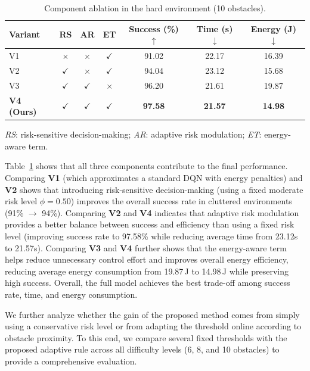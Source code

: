 \documentclass[runningheads]{llncs}
\begin{document}
\begin{table}[!htbp]
\centering
\caption{Component ablation in the hard environment (10 obstacles).}
\label{tab:ablation_components}
\setlength{\tabcolsep}{5pt}
\renewcommand{\arraystretch}{1.10}
\begin{tabular*}{\linewidth}{@{\extracolsep{\fill}}lcccccc@{}}
\hline
Variant & RS & AR & ET & Success (\%) $\uparrow$ & Time (s) $\downarrow$ & Energy (J) $\downarrow$ \\
\hline
V1 & $\times$     & $\times$     & $\checkmark$ & 91.02 & 22.17 & 16.39 \\
V2 & $\checkmark$ & $\times$     & $\checkmark$ & 94.04 & 23.12 & 15.68 \\
V3 & $\checkmark$ & $\checkmark$ & $\times$     & 96.20 & 21.61 & 19.87 \\
\textbf{V4 (Ours)} & $\checkmark$ & $\checkmark$ & $\checkmark$ & \textbf{97.58} & \textbf{21.57} & \textbf{14.98} \\
\hline
\end{tabular*}

\vspace{2pt}
\footnotesize
\textit{RS}: risk-sensitive decision-making; \textit{AR}: adaptive risk modulation; \textit{ET}: energy-aware term.
\end{table}

Table~\ref{tab:ablation_components} shows that all three components contribute to the final performance.
 Comparing \textbf{V1} (which approximates a standard DQN with energy penalties) and \textbf{V2} shows that introducing risk-sensitive decision-making (using a fixed moderate risk level $\phi=0.50$) improves the overall success rate in cluttered environments (91\% $\to$ 94\%).
Comparing \textbf{V2} and \textbf{V4} indicates that adaptive risk modulation provides a better balance between success and efficiency than using a fixed risk level (improving success rate to 97.58\% while reducing average time from 23.12s to 21.57s).
Comparing \textbf{V3} and \textbf{V4} further shows that the energy-aware term helps reduce unnecessary control effort and improves overall energy efficiency, reducing average energy consumption from 19.87\,J to 14.98\,J while preserving high success.
Overall, the full model achieves the best trade-off among success rate, time, and energy consumption.

We further analyze whether the gain of the proposed method comes from simply using a conservative risk level or from adapting the threshold online according to obstacle proximity.
To this end, we compare several fixed thresholds with the proposed adaptive rule across all difficulty levels (6, 8, and 10 obstacles) to provide a comprehensive evaluation.
\end{document}
